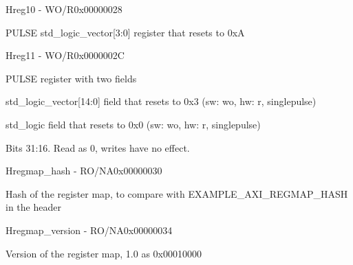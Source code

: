 \documentclass{article}
\begin{document}
\begin{register}{H}{reg10 - WO/R}{0x00000028}  \par PULSE std{\_}logic{\_}vector[3:0] register that resets to 0xA \regnewline
  \label{reg10}
\regnewline
\end{register}

\begin{register}{H}{reg11 - WO/R}{0x0000002C}  \par PULSE register with two fields \regnewline
  \label{reg11}
\regnewline
  \begin{regdesc}\begin{reglist}[field0]
    \item [field0] std{\_}logic{\_}vector[14:0] field that resets to 0x3 (sw: wo, hw: r, singlepulse)
    \item [field1] std{\_}logic field that resets to 0x0 (sw: wo, hw: r, singlepulse)
    \item [reserved] Bits 31:16. Read as 0, writes have no effect.
  \end{reglist}\end{regdesc}
\end{register}

\begin{register}{H}{regmap{\_}hash - RO/NA}{0x00000030}  \par Hash of the register map, to compare with EXAMPLE{\_}AXI{\_}REGMAP{\_}HASH in the header \regnewline
  \label{regmap_hash}
\regnewline
\end{register}

\begin{register}{H}{regmap{\_}version - RO/NA}{0x00000034}  \par Version of the register map, 1.0 as 0x00010000 \regnewline
  \label{regmap_version}
\regnewline
\end{register}
\end{document}
